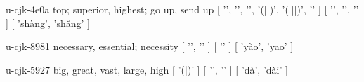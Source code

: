 \begin{multicols}{2}
\lettrine[lines=3]{\cjkgGlue{}}{}\begin{minipage}{0.8\linewidth} u-cjk-4e0a  top; superior, highest; go up, send up  [ '\cjkgGlue{}', '\cjkgGlue{}', '\cjkgGlue{}', '\cjkgGlue{}(\cjkgGlue{}|\cjkgGlue{}|\cjkgGlue{})', '\cjkgGlue{}(\cjkgGlue{}|\cjkgGlue{}|\cjkgGlue{}|\cjkgGlue{})', '\cjkgGlue{}' ]  [ '\cjkgGlue{}', '\cjkgGlue{}', '\cjkgGlue{}' ]  [ 'shàng', 'shǎng' ] \end{minipage}

\lettrine[lines=3]{\cjkgGlue{}}{}\begin{minipage}{0.8\linewidth} u-cjk-8981  necessary, essential; necessity  [ '\cjkgGlue{}', '\cjkgGlue{}' ]  [ '\cjkgGlue{}' ]  [ 'yào', 'yāo' ] \end{minipage}

\lettrine[lines=3]{\cjkgGlue{}}{}\begin{minipage}{0.8\linewidth} u-cjk-5927  big, great, vast, large, high  [ '\cjkgGlue{}(\cjkgGlue{}|\cjkgGlue{})' ]  [ '\cjkgGlue{}', '\cjkgGlue{}' ]  [ 'dà', 'dài' ] \end{minipage}


\end{multicols}
